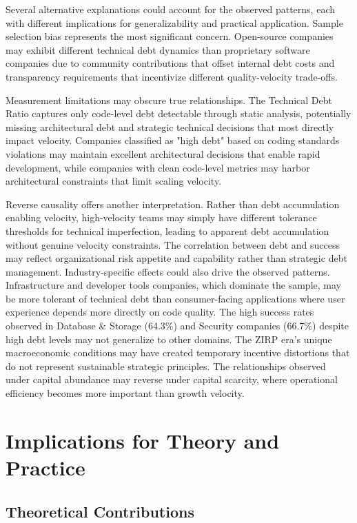Several alternative explanations could account for the observed patterns, each with different implications for generalizability and practical application. Sample selection bias represents the most significant concern. Open-source companies may exhibit different technical debt dynamics than proprietary software companies due to community contributions that offset internal debt costs and transparency requirements that incentivize different quality-velocity trade-offs.

Measurement limitations may obscure true relationships. The Technical Debt Ratio captures only code-level debt detectable through static analysis, potentially missing architectural debt and strategic technical decisions that most directly impact velocity. Companies classified as "high debt" based on coding standards violations may maintain excellent architectural decisions that enable rapid development, while companies with clean code-level metrics may harbor architectural constraints that limit scaling velocity.

Reverse causality offers another interpretation. Rather than debt accumulation enabling velocity, high-velocity teams may simply have different tolerance thresholds for technical imperfection, leading to apparent debt accumulation without genuine velocity constraints. The correlation between debt and success may reflect organizational risk appetite and capability rather than strategic debt management.
Industry-specific effects could also drive the observed patterns. Infrastructure and developer tools companies, which dominate the sample, may be more tolerant of technical debt than consumer-facing applications where user experience depends more directly on code quality. The high success rates observed in Database \& Storage (64.3\%) and Security companies (66.7\%) despite high debt levels may not generalize to other domains.
The \ac{ZIRP} era's unique macroeconomic conditions may have created temporary incentive distortions that do not represent sustainable strategic principles. The relationships observed under capital abundance may reverse under capital scarcity, where operational efficiency becomes more important than growth velocity.

\section{Implications for Theory and Practice}

\subsection{Theoretical Contributions}


